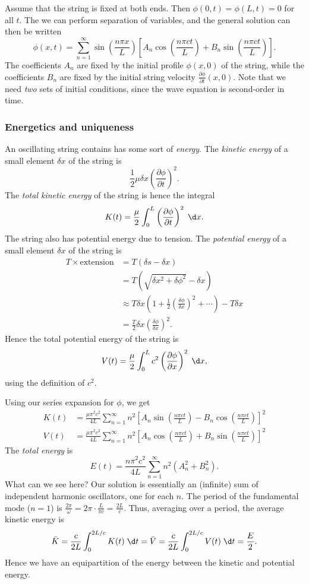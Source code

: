 \documentclass[a4paper]{article}
\begin{document}
Assume that the string is fixed at both ends. Then $\phi(0, t) = \phi(L, t) = 0$ for all $t$. The we can perform separation of variables, and the general solution can then be written
\[
  \phi(x, t) = \sum_{n = 1}^\infty \sin\left(\frac{n \pi x}{L}\right)\left[A_n \cos\left(\frac{n \pi c t}{L}\right) + B_n \sin\left(\frac{n\pi ct}{L}\right)\right].
\]
The coefficients $A_n$ are fixed by the initial profile $\phi(x, 0)$ of the string, while the coefficients $B_n$ are fixed by the initial string velocity $\frac{\partial \phi}{\partial t} (x, 0)$. Note that we need \emph{two} sets of initial conditions, since the wave equation is second-order in time.

\subsubsection*{Energetics and uniqueness}
An oscillating string contains has some sort of \emph{energy}. The \emph{kinetic energy} of a small element $\delta x$ of the string is
\[
  \frac{1}{2}\mu \delta x\left(\frac{\partial \phi}{\partial t}\right)^2.
\]
The \emph{total kinetic energy} of the string is hence the integral
\[
  K(t) = \frac{\mu}{2}\int_0^L \left(\frac{\partial \phi}{\partial t}\right)^2 \;\d x.
\]
The string also has potential energy due to tension. The \emph{potential energy} of a small element $\delta x$ of the string is
\begin{align*}
  T\times \text{extension} &= T(\delta s - \delta x) \\
  &= T(\sqrt{\delta x^2 + \delta \phi^2} - \delta x)\\
  &\approx T\delta x\left(1 + \frac{1}{2}\left(\frac{\delta \phi}{\delta x}\right)^2 + \cdots\right) - T \delta x\\
  &= \frac{T}{2}\delta x \left(\frac{\delta \phi}{\delta x}\right)^2.
\end{align*}
Hence the total potential energy of the string is
\[
  V(t) = \frac{\mu}{2}\int_0^L c^2 \left(\frac{\partial \phi}{\partial x}\right)^2 \;\d x,
\]
using the definition of $c^2$.

Using our series expansion for $\phi$, we get
\begin{align*}
  K(t) &= \frac{\mu \pi^2 c^2}{4L}\sum_{n = 1}^\infty n^2 \left[A_n \sin \left(\frac{n\pi c t}{L}\right) - B_n \cos \left(\frac{n\pi ct}{L}\right)\right]^2\\
  V(t) &= \frac{\mu\pi^2 c^2}{4L} \sum_{n = 1}^\infty n^2 \left[A_n \cos\left(\frac{n\pi ct}{L}\right) + B_n \sin\left(\frac{n\pi ct}{L}\right)\right]^2
\end{align*}
The \emph{total energy} is
\[
  E(t) = \frac{n\pi^2 c^2}{4L}\sum_{n = 1}^\infty n^2 (A_n^2 + B_n^2).
\]
What can we see here? Our solution is essentially an (infinite) sum of independent harmonic oscillators, one for each $n$. The period of the fundamental mode ($n = 1$) is $\frac{2\pi}{\omega} = 2\pi \cdot \frac{L}{\pi c} = \frac{2L}{c}$. Thus, averaging over a period, the average kinetic energy is
\[
  \bar K = \frac{c}{2L} \int_0^{2L/c} K(t)\;\d t = \bar V = \frac{c}{2L}\int_0^{2L/c} V(t)\;\d t = \frac{E}{2}.
\]
Hence we have an equipartition of the energy between the kinetic and potential energy.
\end{document}
